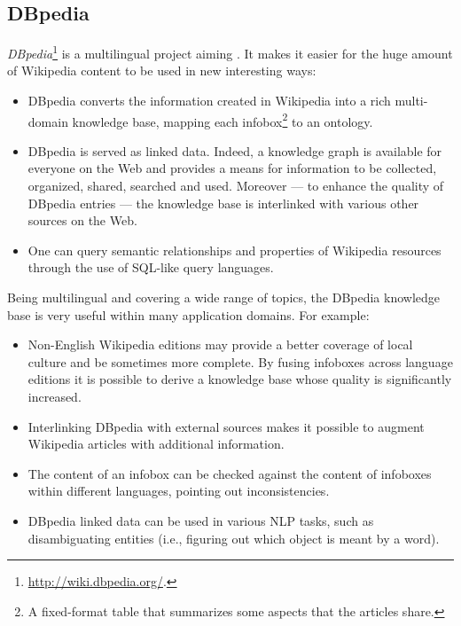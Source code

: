         \subsection{DBpedia}
            \emph{DBpedia}\footnote{\url{http://wiki.dbpedia.org/}.} is a multilingual project aiming  \cite{Bizer}. It makes it easier for the huge amount of Wikipedia content to be used in new interesting ways:
            \begin{itemize}
                \item DBpedia converts the information created in Wikipedia into a rich multi-domain knowledge base, mapping each infobox\footnote{A fixed-format table that summarizes some aspects that the articles share.} to an ontology.
                \item DBpedia is served as linked data. Indeed, a knowledge graph is available for everyone on the Web and provides a means for information to be collected, organized, shared, searched and used. Moreover --- to enhance the quality of DBpedia entries --- the knowledge base is interlinked with various other sources on the Web.
                \item One can query semantic relationships and properties of Wikipedia resources through the use of SQL-like query languages.
            \end{itemize}
            Being multilingual and covering a wide range of topics, the DBpedia knowledge base is very useful within many application domains. For example:
            \begin{itemize}
                \item Non-English Wikipedia editions may provide a better coverage of local culture and be sometimes more complete. By fusing infoboxes across language editions it is possible to derive a knowledge base whose quality is significantly increased.
                \item Interlinking DBpedia with external sources makes it possible to augment Wikipedia articles with additional information.
                \item The content of an infobox can be checked against the content of infoboxes within different languages, pointing out inconsistencies.
                \item DBpedia linked data can be used in various NLP tasks, such as disambiguating entities (i.e., figuring out which object is meant by a word).
            \end{itemize}

